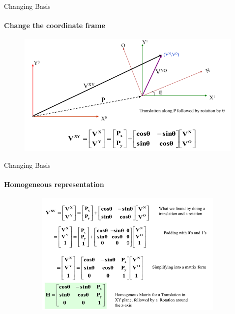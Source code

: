 \documentclass[aspectratio=169,notes]{beamer}
\begin{document}
\begin{frame}[t]{Changing Basis}
\framesubtitle{Change the coordinate frame}
\vspace{-0.6cm}
    \begin{figure}[H]
        \centering\includegraphics[height=6cm,width=1\textwidth,keepaspectratio]{change_klimchik_1.png}
        \label{fig:change_klimchik_1.png}
    \end{figure}
\end{frame}

\begin{frame}[t]{Changing Basis}
    \framesubtitle{Homogeneous representation}
    \vspace{-0.6cm}
        \begin{figure}[H]
            \centering\includegraphics[height=6cm,width=1\textwidth,keepaspectratio]{change_klimchik_2.png}
            \label{fig:change_klimchik_2.png}
        \end{figure}
    \end{frame}
\end{document}
